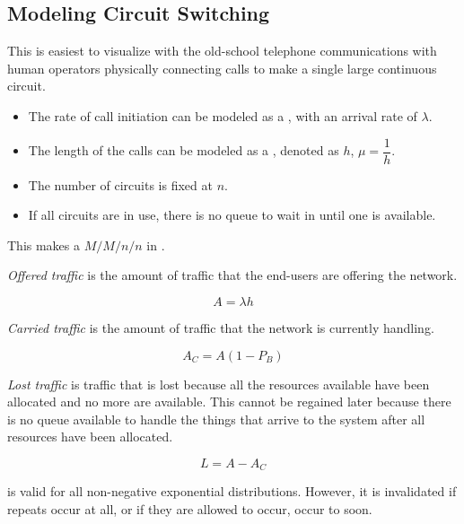 \subsection{Modeling Circuit Switching}\label{subsec:Model_Circuit_Switching}
This is easiest to visualize with the old-school telephone communications with human operators physically connecting calls to make a single large continuous circuit.

\begin{itemize}[noitemsep]
\item The rate of call initiation can be modeled as a , with an arrival rate of $\lambda$.
\item The length of the calls can be modeled as a , denoted as $h$, $\mu = \dfrac{1}{h}$.
\item The number of circuits is fixed at $n$.
\item If all circuits are in use, there is no queue to wait in until one is available.
\end{itemize}

This makes  a $M/M/n/n$  in .

\begin{definition}\label{def:Offered_Traffic}
  \emph{Offered traffic} is the amount of traffic that the end-users are offering the network.

  \begin{equation}\label{eq:Offered_Traffic}
    A = \lambda h
  \end{equation}
\end{definition}

\begin{definition}\label{def:Carried_Traffic}
  \emph{Carried traffic} is the amount of traffic that the network is currently handling.

  \begin{equation}\label{eq:Carried_Traffic}
    A_{C} = A (1-P_{B})
  \end{equation}
\end{definition}

\begin{definition}\label{def:Lost_Traffic}
  \emph{Lost traffic} is traffic that is lost because all the resources available have been allocated and no more are available.
  This cannot be regained later because there is no queue available to handle the things that arrive to the system after all resources have been allocated.

  \begin{equation}\label{eq:Lost_Traffic}
    L = A - A_{C}
  \end{equation}

  \begin{remark}[Validity]\label{rmk:Validity_Lost_Traffic}
     is valid for all non-negative exponential distributions.
    However, it is invalidated if repeats occur at all, or if they are allowed to occur, occur to soon.
  \end{remark}
\end{definition}


